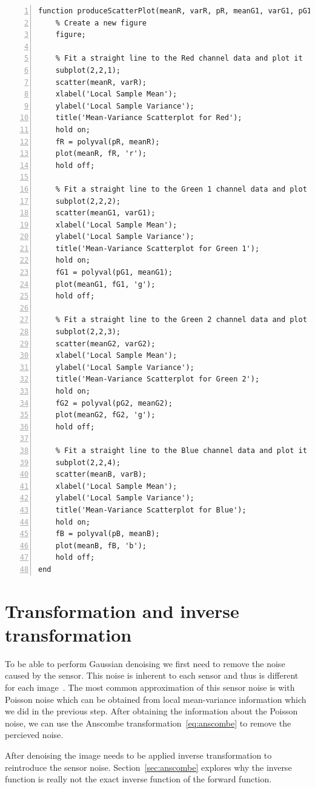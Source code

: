 \documentclass[12pt,a4paper,english
]{tunithesis}
\begin{document}
\begin{lstlisting}[style=Matlab-editor, numbers=left, basicstyle=\small]
function produceScatterPlot(meanR, varR, pR, meanG1, varG1, pG1, meanG2, varG2, pG2, meanB, varB, pB)
    % Create a new figure
    figure;
    
    % Fit a straight line to the Red channel data and plot it
    subplot(2,2,1);
    scatter(meanR, varR);
    xlabel('Local Sample Mean');
    ylabel('Local Sample Variance');
    title('Mean-Variance Scatterplot for Red');
    hold on;
    fR = polyval(pR, meanR);
    plot(meanR, fR, 'r');
    hold off;
    
    % Fit a straight line to the Green 1 channel data and plot it
    subplot(2,2,2);
    scatter(meanG1, varG1);
    xlabel('Local Sample Mean');
    ylabel('Local Sample Variance');
    title('Mean-Variance Scatterplot for Green 1');
    hold on;
    fG1 = polyval(pG1, meanG1);
    plot(meanG1, fG1, 'g');
    hold off;

    % Fit a straight line to the Green 2 channel data and plot it
    subplot(2,2,3);
    scatter(meanG2, varG2);
    xlabel('Local Sample Mean');
    ylabel('Local Sample Variance');
    title('Mean-Variance Scatterplot for Green 2');
    hold on;
    fG2 = polyval(pG2, meanG2);
    plot(meanG2, fG2, 'g');
    hold off;
    
    % Fit a straight line to the Blue channel data and plot it
    subplot(2,2,4);
    scatter(meanB, varB);
    xlabel('Local Sample Mean');
    ylabel('Local Sample Variance');
    title('Mean-Variance Scatterplot for Blue');
    hold on;
    fB = polyval(pB, meanB);
    plot(meanB, fB, 'b');
    hold off;
end
\end{lstlisting}

\section{Transformation and inverse transformation}
To be able to perform Gaussian denoising we first need to remove the noise caused by the sensor. This noise is inherent to each sensor and thus is different for each image~\cite{poissonnoise2011}. The most common approximation of this sensor noise is with Poisson noise which can be obtained from local mean-variance information which we did in the previous step. After obtaining the information about the Poisson noise, we can use the Anscombe transformation~\ref{eq:anscombe} to remove the percieved noise.

After denoising the image needs to be applied inverse transformation to reintroduce the sensor noise. Section~\ref{sec:anscombe} explores why the inverse function is really not the exact inverse function of the forward function.
\end{document}
